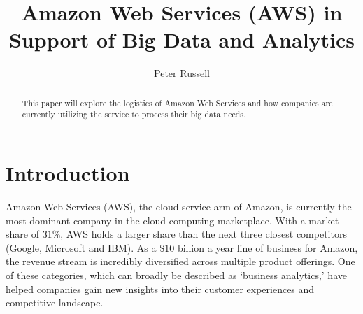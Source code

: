 \documentclass[sigconf]{acmart}
\begin{document}
\title{Amazon Web Services (AWS) in Support of Big Data and Analytics}


\author{Peter Russell}

\begin{abstract}
This paper will explore the logistics of Amazon Web Services and how companies are currently utilizing the service to process their big data needs. 
\end{abstract}


\maketitle

\section{Introduction}

Amazon Web Services (AWS), the cloud service arm of Amazon, is currently the most dominant company in the cloud computing marketplace. With a market share of $31\%$, AWS holds a larger share than the next three closest competitors (Google, Microsoft and IBM)\cite{aws_mkt}. As a $\$10$ billion a year line of business for Amazon, the revenue stream is incredibly diversified across multiple product offerings. One of these categories, which can broadly be described as `business analytics,' have helped companies gain new insights into their customer experiences and competitive landscape. 



 
\end{document}

